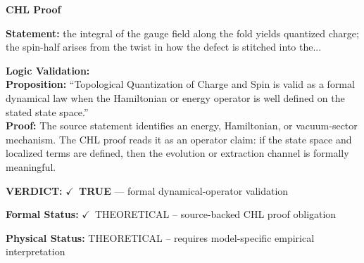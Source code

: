 \vspace{0.45em}
\noindent\textbf{CHL Proof}\par
\textbf{Statement:} the integral of the gauge field along the fold yields quantized charge; the spin-half
arises from the twist in how the defect is stitched into the...

\textbf{Logic Validation:}\\
\textbf{Proposition:} ``Topological Quantization of Charge and Spin is valid as a formal dynamical law when the
Hamiltonian or energy operator is well defined on the stated state space.''\\
\textbf{Proof:} The source statement identifies an energy, Hamiltonian, or vacuum-sector mechanism. The
CHL proof reads it as an operator claim: if the state space and localized terms are
defined, then the evolution or extraction channel is formally meaningful.

\textbf{VERDICT:} \ensuremath{\checkmark}\ \textbf{TRUE} --- formal dynamical-operator validation

\textbf{Formal Status:} \ensuremath{\checkmark}\ THEORETICAL -- source-backed CHL proof obligation

\textbf{Physical Status:} THEORETICAL -- requires model-specific empirical interpretation
\par\vspace{0.45em}
\par
\ifTZPDarkEdition
{}
\fi
\endgroup
\endgroup
